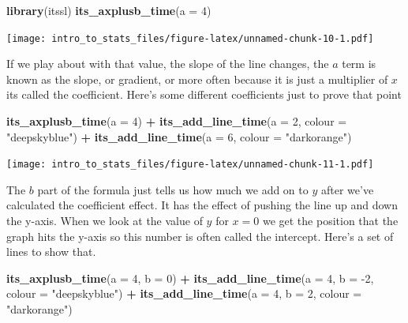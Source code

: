\documentclass[
]{book}
\newenvironment{Shaded}{\begin{snugshade}}{\end{snugshade}}
\newcommand{\DataTypeTok}[1]{\textcolor[rgb]{0.13,0.29,0.53}{#1}}
\newcommand{\DecValTok}[1]{\textcolor[rgb]{0.00,0.00,0.81}{#1}}
\newcommand{\KeywordTok}[1]{\textcolor[rgb]{0.13,0.29,0.53}{\textbf{#1}}}
\newcommand{\NormalTok}[1]{#1}
\newcommand{\OperatorTok}[1]{\textcolor[rgb]{0.81,0.36,0.00}{\textbf{#1}}}
\newcommand{\StringTok}[1]{\textcolor[rgb]{0.31,0.60,0.02}{#1}}
\begin{document}
\begin{Shaded}
\begin{Highlighting}[]
\KeywordTok{library}\NormalTok{(itssl)}
\KeywordTok{its_axplusb_time}\NormalTok{(}\DataTypeTok{a =} \DecValTok{4}\NormalTok{)}
\end{Highlighting}
\end{Shaded}

\texttt{[image: intro\_to\_stats\_files/figure-latex/unnamed-chunk-10-1.pdf]}

If we play about with that value, the slope of the line changes, the \(a\) term is known as the slope, or gradient, or more often because it is just a multiplier of \(x\) its called the coefficient. Here's some different coefficients just to prove that point

\begin{Shaded}
\begin{Highlighting}[]
\KeywordTok{its_axplusb_time}\NormalTok{(}\DataTypeTok{a =} \DecValTok{4}\NormalTok{) }\OperatorTok{+}
\StringTok{  }\KeywordTok{its_add_line_time}\NormalTok{(}\DataTypeTok{a =} \DecValTok{2}\NormalTok{, }\DataTypeTok{colour =} \StringTok{"deepskyblue"}\NormalTok{) }\OperatorTok{+}
\StringTok{  }\KeywordTok{its_add_line_time}\NormalTok{(}\DataTypeTok{a =} \DecValTok{6}\NormalTok{, }\DataTypeTok{colour =} \StringTok{"darkorange"}\NormalTok{)}
\end{Highlighting}
\end{Shaded}

\texttt{[image: intro\_to\_stats\_files/figure-latex/unnamed-chunk-11-1.pdf]}

The \(b\) part of the formula just tells us how much we add on to \(y\) after we've calculated the coefficient effect. It has the effect of pushing the line up and down the y-axis. When we look at the value of \(y\) for \(x = 0\) we get the position that the graph hits the y-axis so this number is often called the intercept. Here's a set of lines to show that.

\begin{Shaded}
\begin{Highlighting}[]
\KeywordTok{its_axplusb_time}\NormalTok{(}\DataTypeTok{a =} \DecValTok{4}\NormalTok{, }\DataTypeTok{b =} \DecValTok{0}\NormalTok{) }\OperatorTok{+}\StringTok{ }
\StringTok{  }\KeywordTok{its_add_line_time}\NormalTok{(}\DataTypeTok{a =} \DecValTok{4}\NormalTok{, }\DataTypeTok{b =} \DecValTok{-2}\NormalTok{, }\DataTypeTok{colour =} \StringTok{"deepskyblue"}\NormalTok{) }\OperatorTok{+}
\StringTok{  }\KeywordTok{its_add_line_time}\NormalTok{(}\DataTypeTok{a =} \DecValTok{4}\NormalTok{, }\DataTypeTok{b =} \DecValTok{2}\NormalTok{, }\DataTypeTok{colour =} \StringTok{"darkorange"}\NormalTok{)}
\end{Highlighting}
\end{Shaded}
\end{document}
